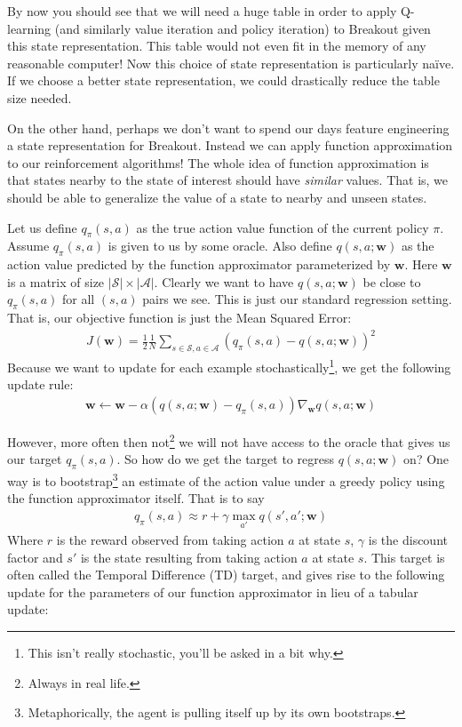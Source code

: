 \documentclass[11pt]{article}
\numberwithin{equation}{section} %
\numberwithin{figure}{section} %
\numberwithin{table}{section} %
\newcommand{\wv}{\mathbf{w}}
\begin{document}
By now you should see that we will need a huge table in order to apply Q-learning (and similarly value iteration and policy iteration) to Breakout given this state representation. This table would not even fit in the memory of any reasonable computer! Now this choice of state representation is particularly na\"ive. If we choose a better state representation, we could drastically reduce the table size needed. 

On the other hand, perhaps we don't want to spend our days feature engineering a state representation for Breakout. Instead we can apply function approximation to our reinforcement algorithms! The whole idea of function approximation is that states nearby to the state of interest should have \emph{similar} values. That is, we should be able to generalize the value of a state to nearby and unseen states.

Let us define $q_\pi(s, a)$ as the true action value function of the current policy $\pi$. Assume $q_\pi(s,a)$ is given to us by some oracle. Also define $q(s, a; \wv)$ as the action value predicted by the function approximator parameterized by $\wv$. Here $\wv$ is a matrix of size $|\mathcal{S}| \times |\mathcal{A}|$. Clearly we want to have $q(s, a; \wv)$ be close to $q_\pi(s, a)$ for all $(s, a)$ pairs we see. This is just our standard regression setting. That is, our objective function is just the Mean Squared Error:
\begin{align}
J(\wv) = \frac{1}{2} \frac{1}{N} \sum_{s\in\mathcal{S}, a\in\mathcal{A}} \left(q_\pi(s, a) - q(s, a; \wv) \right)^2
\end{align}
Because we want to update for each example stochastically\footnote{This isn't really stochastic, you'll be asked in a bit why.}, we get the following update rule:
\begin{align}
\wv \leftarrow \wv - \alpha \left(q(s, a; \wv) - q_\pi(s,a) \right) \nabla_\wv q(s, a; \wv)
\end{align}

However, more often then not\footnote{Always in real life.} we will not have access to the oracle that gives us our target $q_\pi(s, a)$. So how do we get the target to regress $q(s, a; \wv)$ on? One way is to bootstrap\footnote{Metaphorically, the agent is pulling itself up by its own bootstraps.} an estimate of the action value under a greedy policy using the function approximator itself. That is to say
\begin{align}
q_\pi (s, a) \approx r + \gamma \max_{a'} q(s', a'; \wv)
\end{align}
Where $r$ is the reward observed from taking action $a$ at state $s$, $\gamma$ is the discount factor and $s'$ is the state resulting from taking action $a$ at state $s$. This target is often called the Temporal Difference (TD) target, and gives rise to the following update for the parameters of our function approximator in lieu of a tabular update:
\end{document}
